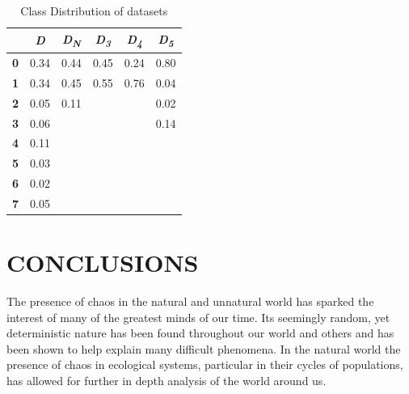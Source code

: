 \documentclass[letterpaper, 10 pt, conference]{ieeeconf}  %
\begin{document}
\begin{table}
\caption{Class Distribution of datasets}
\setlength{\tabcolsep}{5mm} %
\def\arraystretch{1.25} %
\centering

  \begin{tabular}{|c|c|c|c|c|c|}
	\hline
     & \textbf{\textit{D}} &  \textbf{\textit{D\textsubscript{N}}} &  \textbf{\textit{D\textsubscript{3}}} &  \textbf{\textit{D\textsubscript{4}}} &  \textbf{\textit{D\textsubscript{5}}}\\ \hline
   \textbf{0} & 0.34 & 0.44 & 0.45 & 0.24 & 0.80\\ \hline
   \textbf{1} & 0.34 & 0.45 & 0.55 & 0.76 & 0.04\\ \hline
   \textbf{2} & 0.05 & 0.11 &  &  & 0.02\\ \hline
   \textbf{3} & 0.06 &  &  &  & 0.14\\ \hline
   \textbf{4} & 0.11 &  &  &  & \\ \hline
   \textbf{5} & 0.03 &  &  &  & \\ \hline
   \textbf{6} & 0.02 &  &  &  & \\ \hline
   \textbf{7} & 0.05 &  &  &  & \\ \hline
  \end{tabular}
\end{table}


\section{CONCLUSIONS}
	The presence of chaos in the natural and unnatural world has sparked the interest of many of the greatest minds of our time. Its seemingly random, yet deterministic nature has been found throughout our world and others and has been shown to help explain many difficult phenomena. In the natural world the presence of chaos in ecological systems, particular in their cycles of populations, has allowed for further in depth analysis of the world around us. 
\end{document}
